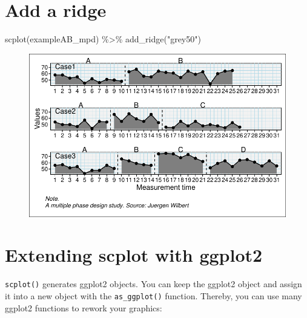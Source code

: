 \documentclass[
  letterpaper,
  DIV=11,
  numbers=noendperiod]{scrreprt}
\newenvironment{Shaded}{\begin{snugshade}}{\end{snugshade}}
\newcommand{\FunctionTok}[1]{\textcolor[rgb]{0.28,0.35,0.67}{#1}}
\newcommand{\NormalTok}[1]{\textcolor[rgb]{0.00,0.23,0.31}{#1}}
\newcommand{\SpecialCharTok}[1]{\textcolor[rgb]{0.37,0.37,0.37}{#1}}
\newcommand{\StringTok}[1]{\textcolor[rgb]{0.13,0.47,0.30}{#1}}
\begin{document}
\hypertarget{add-a-ridge}{%
\section{Add a ridge}\label{add-a-ridge}}

\begin{Shaded}
\begin{Highlighting}[]
\FunctionTok{scplot}\NormalTok{(exampleAB\_mpd) }\SpecialCharTok{\%\textgreater{}\%} 
  \FunctionTok{add\_ridge}\NormalTok{(}\StringTok{"grey50"}\NormalTok{)}
\end{Highlighting}
\end{Shaded}

\begin{figure}[H]

{\centering \includegraphics{./ch_scplot_files/figure-pdf/ridge1-1.pdf}

}

\end{figure}

\hypertarget{extending-scplot-with-ggplot2}{%
\section{Extending scplot with
ggplot2}\label{extending-scplot-with-ggplot2}}

\texttt{scplot()} generates ggplot2 objects. You can keep the ggplot2
object and assign it into a new object with the \texttt{as\_ggplot()}
function. Thereby, you can use many ggplot2 functions to rework your
graphics:
\end{document}
